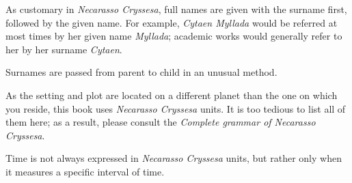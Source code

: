 
As customary in \emph{Necarasso Cryssesa}, full names are given with the surname first, followed by the given name. For example, \emph{Cytaen Myllada} would be referred at most times by her given name \emph{Myllada}; academic works would generally refer to her by her surname \emph{Cytaen}.

Surnames are passed from parent to child in an unusual method.

\centeredstars

As the setting and plot are located on a different planet than the one on which you reside, this book uses \emph{Necarasso Cryssesa} units. It is too tedious to list all of them here; as a result, please consult the \emph{Complete grammar of Necarasso Cryssesa}.

Time is not always expressed in \emph{Necarasso Cryssesa} units, but rather only when it measures a specific interval of time.